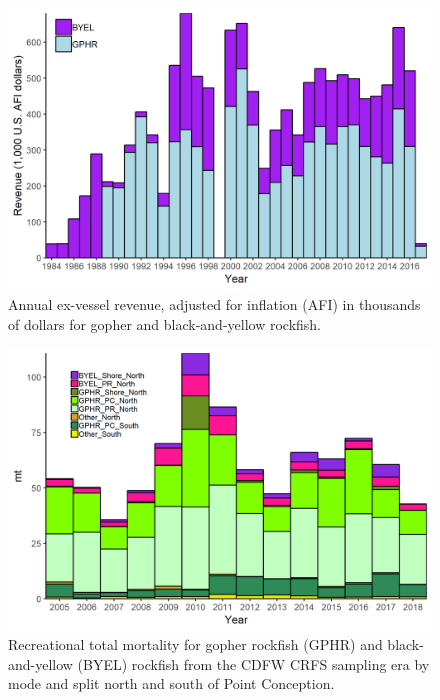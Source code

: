 \documentclass[12pt,]{article}
\begin{document}
\begin{figure}
\centering
\includegraphics{Figures/GBY_revenue.png}
\caption{Annual ex-vessel revenue, adjusted for inflation (AFI) in
thousands of dollars for gopher and black-and-yellow rockfish.
\label{fig:GBY_revenue}}
\end{figure}

\begin{figure}
\centering
\includegraphics{Figures/CRFS_totalmort_gby.png}
\caption{Recreational total mortality for gopher rockfish (GPHR) and
black-and-yellow (BYEL) rockfish from the CDFW CRFS sampling era by mode
and split north and south of Point Conception. \label{fig:CFRS_catches}}
\end{figure}
\end{document}
